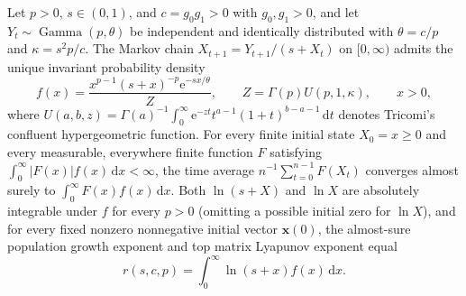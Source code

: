 \begin{proposition}\label{prop:exact-R1}
Let $p > 0$, $s \in (0,1)$, and $c = g_0 g_1 > 0$ with $g_0, g_1 > 0$, and let $Y_t \sim \operatorname{Gamma}(p, \theta)$ be independent and identically distributed with $\theta = c/p$ and $\kappa = s^2 p/c$. The Markov chain $X_{t+1} = Y_{t+1}/(s + X_t)$ on $[0,\infty)$ admits the unique invariant probability density
\begin{equation}
f(x) = \frac{x^{p-1}(s+x)^{-p}\mathrm{e}^{-sx/\theta}}{Z}, \qquad
Z = \Gamma(p) U(p, 1, \kappa), \qquad x > 0,
\label{eq:exact-density}
\end{equation}
where $U(a,b,z) = \Gamma(a)^{-1}\int_0^\infty \mathrm{e}^{-zt} t^{a-1}(1+t)^{b-a-1}\,\mathrm{d}t$ denotes Tricomi's confluent hypergeometric function. For every finite initial state $X_0 = x \ge 0$ and every measurable, everywhere finite function $F$ satisfying $\int_0^\infty |F(x)| f(x)\,\mathrm{d}x < \infty$, the time average $n^{-1}\sum_{t=0}^{n-1} F(X_t)$ converges almost surely to $\int_0^\infty F(x) f(x)\,\mathrm{d}x$. Both $\ln(s+X)$ and $\ln X$ are absolutely integrable under $f$ for every $p > 0$ (omitting a possible initial zero for $\ln X$), and for every fixed nonzero nonnegative initial vector $\mathbf{x}(0)$, the almost-sure population growth exponent and top matrix Lyapunov exponent equal
\begin{equation}
r(s,c,p) = \int_0^\infty \ln(s+x) f(x)\,\mathrm{d}x.
\label{eq:exact-r-integral}
\end{equation}
\end{proposition}

